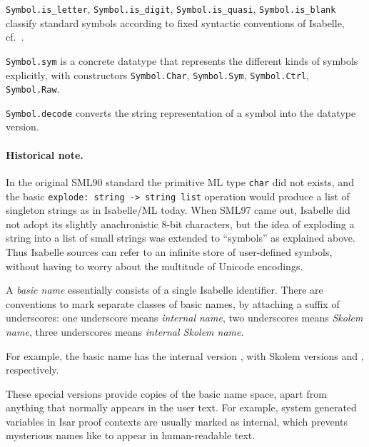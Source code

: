 \begin{isabellebody}
\begin{isamarkuptext}
\begin{description}
  \item \verb|Symbol.is_letter|, \verb|Symbol.is_digit|, \verb|Symbol.is_quasi|, \verb|Symbol.is_blank| classify standard
  symbols according to fixed syntactic conventions of Isabelle, cf.\
  \cite{isabelle-isar-ref}.

  \item \verb|Symbol.sym| is a concrete datatype that represents
  the different kinds of symbols explicitly, with constructors \verb|Symbol.Char|, \verb|Symbol.Sym|, \verb|Symbol.Ctrl|, \verb|Symbol.Raw|.

  \item \verb|Symbol.decode| converts the string representation of a
  symbol into the datatype version.

  \end{description}

  \paragraph{Historical note.} In the original SML90 standard the
  primitive ML type \verb|char| did not exists, and the basic \verb|explode: string -> string list| operation would produce a list of
  singleton strings as in Isabelle/ML today.  When SML97 came out,
  Isabelle did not adopt its slightly anachronistic 8-bit characters,
  but the idea of exploding a string into a list of small strings was
  extended to ``symbols'' as explained above.  Thus Isabelle sources
  can refer to an infinite store of user-defined symbols, without
  having to worry about the multitude of Unicode encodings.%
\end{isamarkuptext}%
\isamarkuptrue%
%
\endisatagmlref
{\isafoldmlref}%
%
\isadelimmlref
%
\endisadelimmlref
%
\isamarkuptrue%
%
\begin{isamarkuptext}%
A \emph{basic name} essentially consists of a single Isabelle
  identifier.  There are conventions to mark separate classes of basic
  names, by attaching a suffix of underscores: one underscore means
  \emph{internal name}, two underscores means \emph{Skolem name},
  three underscores means \emph{internal Skolem name}.

  For example, the basic name  has the internal version
  \isa{foo{\isacharunderscore}}, with Skolem versions  and , respectively.

  These special versions provide copies of the basic name space, apart
  from anything that normally appears in the user text.  For example,
  system generated variables in Isar proof contexts are usually marked
  as internal, which prevents mysterious names like \isa{xaa} to
  appear in human-readable text.


\end{isamarkuptext}
\end{isabellebody}
